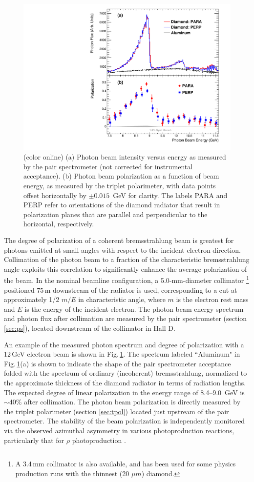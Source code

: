 \begin{figure}[tbp]
\begin{center}
 \includegraphics[clip=true,width=0.5\linewidth]{figures/gx3102_pi0etaAsym2016_fig0_beam.pdf}
\end{center}
\caption{(color online) (a) Photon beam intensity versus energy as measured by the pair spectrometer
(not corrected for instrumental acceptance).  (b) Photon beam polarization as a function of beam energy,
as measured by the triplet polarimeter, with data points offset horizontally by $\pm0.015$~GeV for clarity.
The labels PARA and PERP refer to orientations of the diamond radiator that result in polarization
planes that are parallel and perpendicular to the horizontal, respectively.
        }
\label{fig:beam:gx3102_pi0etaAsym2016_fig0_beam} 
\end{figure}

The degree of polarization of a coherent bremsstrahlung beam is greatest for photons emitted at small
angles with respect to the incident electron direction. Collimation of the photon beam to a fraction
of the characteristic brems\-strah\-lung angle exploits this correlation to significantly enhance
the average polarization of the beam. 
In the nominal \GX{} beamline configuration, a 5.0-mm-diameter collimator
\footnote{A 3.4\,mm collimator is also available, and has been used for some physics production runs
with the thinnest (20 $\mu m$) diamond.}
positioned 75\,m downstream of the radiator is used, corresponding to a cut at approximately
1/2 $m/E$ in characteristic angle, where $m$ is the electron rest mass and
$E$ is the energy of the incident electron. 
The photon beam energy spectrum and photon flux after collimation are measured
by the pair spectrometer (section \ref{sec:ps}), located downstream of the collimator in Hall D. 

An example of the measured photon spectrum and degree of polarization with a 12\,GeV electron beam is
shown in Fig.\,\ref{fig:beam:gx3102_pi0etaAsym2016_fig0_beam}. The spectrum labeled ``Aluminum" in 
Fig.\,\ref{fig:beam:gx3102_pi0etaAsym2016_fig0_beam}(a) is shown to indicate the shape of the 
pair spectrometer acceptance folded with the spectrum of ordinary (incoherent) brems\-strah\-lung,
normalized to the approximate thickness of the diamond radiator in terms of radiation lengths.
The expected degree of linear polarization in the energy range of 8.4--9.0~GeV is $\sim$40\% after
collimation.  The photon beam polarization is directly measured by the triplet polarimeter (section \ref{sec:tpol})
located just upstream of the pair spectrometer. The stability of the beam polarization is independently
monitored via the observed azimuthal asymmetry in various photoproduction reactions, particularly that for $\rho$ photoproduction \cite{gx3076}.

